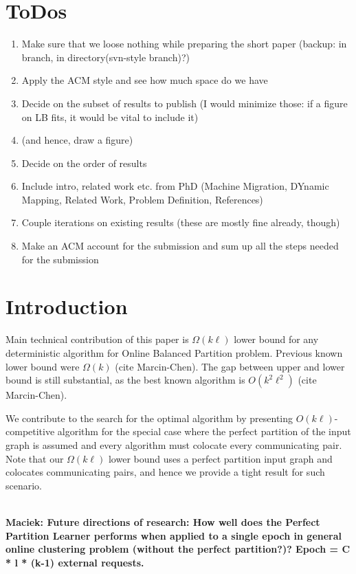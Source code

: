 \documentclass[conference]{IEEEtran}
\newcommand\maciek[1]{\color{brown}\textbf{\\ Maciek: #1}\color{black}}
\begin{document}
\section{ToDos}

\begin{enumerate}
    \item Make sure that we loose nothing while preparing the short paper (backup: in branch, in directory(svn-style branch)?)
    \item Apply the ACM style and see how much space do we have
    \item Decide on the subset of results to publish (I would minimize those: if a figure on LB fits, it would be vital to include it)
    \item (and hence, draw a figure)
    \item Decide on the order of results
    \item Include intro, related work etc. from PhD (Machine Migration, DYnamic Mapping, Related Work, Problem Definition, References)
    \item Couple iterations on existing results (these are mostly fine already, though)
    \item Make an ACM account for the submission and sum up all the steps needed for the submission
\end{enumerate}

\section{Introduction}

Main technical contribution of this paper is $\Omega(k\ell)$ lower bound for any deterministic algorithm for Online Balanced Partition problem.
Previous known lower bound were $\Omega(k)$ (cite Marcin-Chen).
The gap between upper and lower bound is still substantial, as the best known algorithm is $O(k^2\ell^2)$ (cite Marcin-Chen).

We contribute to the search for the optimal algorithm by presenting $O(k\ell)$-competitive algorithm for the special case where the perfect partition of the input graph is assumed and every algorithm must colocate every communicating pair.
Note that our $\Omega(k\ell)$ lower bound uses a perfect partition input graph and colocates communicating pairs, and hence we provide a tight result for such scenario.

\maciek{Future directions of research: How well does the Perfect Partition Learner performs when applied to a single epoch in general online clustering problem (without the perfect partition?)? Epoch = C * l * (k-1) external requests.}
\end{document}
